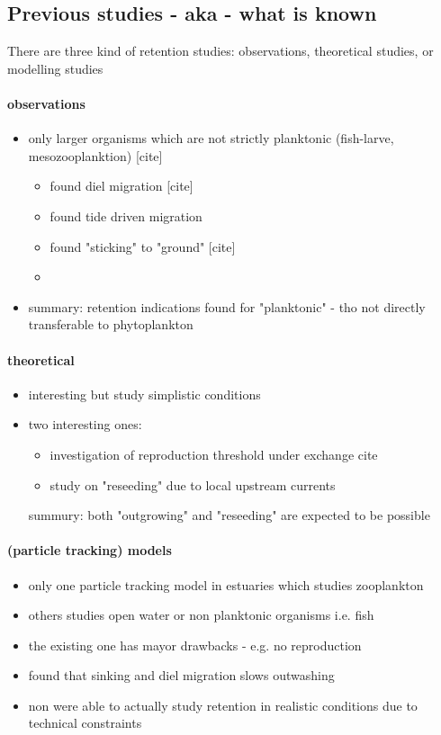 \subsection*{Previous studies - aka - what is known}

There are three kind of retention studies: observations, theoretical studies, or modelling studies

\paragraph{observations}
\begin{itemize}
    \item only larger organisms which are not strictly planktonic (fish-larve, mesozooplanktion) [cite]
    \begin{itemize}
        \item found diel migration  [cite]
        \item found tide driven migration
        \item found "sticking" to "ground" [cite]
        \item 
    \end{itemize}
    \item summary: retention indications found for "planktonic" - tho not directly transferable to phytoplankton
\end{itemize}

\paragraph{theoretical}
\begin{itemize}
    \item interesting but study simplistic conditions 
    \item two interesting ones:
    \begin{itemize}
        \item investigation of reproduction threshold under exchange cite
        \item study on "reseeding" due to local upstream currents
    \end{itemize}
    summury: both "outgrowing" and "reseeding" are expected to be possible
\end{itemize}

\paragraph{(particle tracking) models}
\begin{itemize}
    \item only one particle tracking model in estuaries which studies zooplankton
    \item others studies open water or non planktonic organisms i.e. fish
    \item the existing one has mayor drawbacks - e.g. no reproduction
    \item found that sinking and diel migration slows outwashing
    \item non were able to actually study retention in realistic conditions due to technical constraints
\end{itemize}

